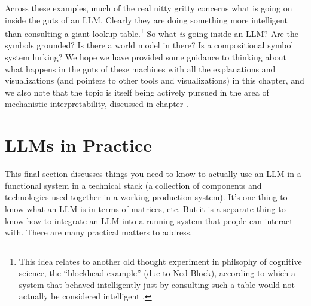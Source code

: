 Across these examples, much of the real nitty gritty concerns what is going on inside the guts of an LLM. Clearly they are doing something more intelligent than consulting a giant lookup table.\footnote{This idea relates to another old thought experiment in philsophy of cognitive science, the ``blockhead example'' (due to Ned Block), according to which a system that behaved intelligently just by consulting such a table would not actually be considered intelligent \cite{milliere2024philosophical1}.} So what \emph{is} going inside an LLM? Are the symbols grounded? Is there a world model in there? Is a compositional symbol system lurking?  We hope we have provided some guidance to thinking about what happens in the guts of these machines with all the explanations and visualizations (and pointers to other tools and visualizations) in this chapter, and we also note that the topic is itself being actively pursued in the area of mechanistic interpretability, discussed in chapter . 




\section{LLMs in Practice}\label{transformersInPractice}

This final section discusses things you need to know to actually use an LLM in a functional system in a technical stack (a collection of components and technologies used together in a working production system).  It's one thing to know what an LLM is in terms of matrices, etc.  But it is a separate thing to know how to integrate an LLM into a running system that people can interact with.  There are many practical matters to address.

